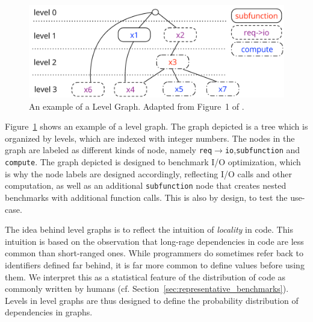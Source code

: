 \begin{figure}[th]
	\centering
	\includegraphics[width=\textwidth]{figures/level-graph.pdf}
	\caption{An example of a Level Graph. Adapted from Figure~1 of \cite{goens_multiprog18}.}
	\label{fig:level_graph}
\end{figure}

Figure~\ref{fig:level_graph} shows an example of a level graph. The graph depicted is a tree which is organized by levels, which are indexed with integer numbers.
The nodes in the graph are labeled as different kinds of node, namely \texttt{req$\rightarrow$io},\texttt{subfunction} and \texttt{compute}.
The graph depicted is designed to benchmark \ac{I/O} optimization, which is why the node labels are designed accordingly, reflecting \ac{I/O} calls and other computation,
as well as an additional \texttt{subfunction} node that creates nested benchmarks with additional function calls.
This is also by design, to test the use-case.

The idea behind level graphs is to reflect the intuition of \emph{locality} in code.
This intuition is based on the observation that long-rage dependencies in code are less common than short-ranged ones.
While programmers do sometimes refer back to identifiers defined far behind, it is far more common to define values before using them.
We interpret this as a statistical feature of the distribution of code as commonly written by humans (cf. Section~\ref{sec:representative_benchmarks}).
Levels in level graphs are thus designed to define the probability distribution of dependencies in graphs.


